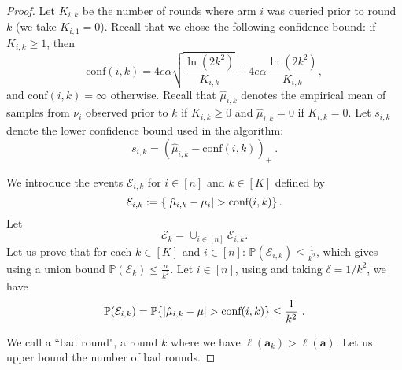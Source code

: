 \begin{proof}
	Let $K_{i,k}$ be the number of rounds where arm $i$ was queried prior to round $k$ (we take $K_{i,1}=0$). Recall that we chose the following confidence bound: if $K_{i,k} \ge 1$, then
	$$
	\text{conf}(i,k) = 4e\alpha\sqrt{\frac{ \ln(2k^2)}{K_{i,k}}}+4e\alpha\frac{ \ln(2k^2)}{K_{i,k}},
	$$
	and $\text{conf}(i,k) = \infty$ otherwise. Recall that $\hat{\mu}_{i,k}$ denotes the empirical mean of samples from $\nu_i$ observed prior to $k$ if $K_{i,k}\ge 0$ and $\hat{\mu}_{i,k}=0$ if $K_{i,k}=0$. Let $s_{i,k}$ denote the lower confidence bound used in the algorithm:
	$$
	s_{i,k} = \left(\hat{\mu}_{i,k} -\text{conf}(i,k)\right)_{+}~.
	$$
	
	\noindent We introduce the events $\mathcal{E}_{i,k}$ for $i \in [n]$ and $k \in [K]$ defined by
	$$
	\mathcal{E}_{i,k} := \left\lbrace \left| \hat{\mu}_{i,k}-\mu_i \right| > \text{conf}(i,k)\right\rbrace.
	$$
	Let 
	$$
	\mathcal{E}_k = \cup_{i \in [n]} \mathcal{E}_{i,k}.
	$$
	Let us prove that for each $k \in [K]$ and $i \in [n]$: $\mathbb{P}\left(\mathcal{E}_{i,k}\right) \le \frac{1}{k^2}$, which gives using a union bound $\mathbb{P}(\mathcal{E}_k) \le \frac{n}{k^2}$. 
	Let $i \in [n]$, using  and taking $\delta = 1/k^2$, we have
	\begin{align*}
		\mathbb{P}(\mathcal{E}_{i,k})
		= \mathbb{P}\{\left| \hat{\mu}_{i,k}-\mu \right| > \text{conf}(i,k)\}
		\le \frac{1}{k^2}~.
	\end{align*}

	\noindent We call a ``bad round", a round $k$ where we have $\ell(\bm{a}_{k}) > \ell(\bar{\bm{a}})$. Let us upper bound the number of bad rounds. 
	

\end{proof}
